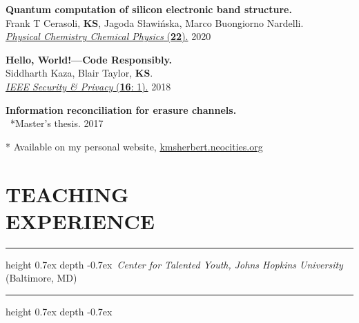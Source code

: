 \documentclass[marginmode, 10pt]{res} %
\newcommand{\me}{\textbf{KS}}       %
\def\Vhrulefill{\leavevmode\leaders\hrule height 0.7ex depth \dimexpr0.4pt-0.7ex\hfill\kern0pt}         %
\begin{document}
\begin{resume}
\textbf{Quantum computation of silicon electronic band structure.} \\
    Frank T Cerasoli, \me, Jagoda S\l{}awi\'nska, Marco Buongiorno Nardelli. \\
    \href{https://arxiv.org/abs/2006.03807}{\textit{Physical Chemistry Chemical Physics} (\textbf{22}).} \hfill 2020

\textbf{Hello, World!—Code Responsibly.} \\
    Siddharth Kaza, Blair Taylor, \me. \\
    \href{https://ieeexplore.ieee.org/document/8283486}{\textit{IEEE Security \& Privacy} (\textbf{16}: 1).} \hfill 2018

\textbf{Information reconciliation for erasure channels.} \\
    ~*Master's thesis. \hfill 2017

* Available on my personal website, \href{kmsherbert.neocities.org}{kmsherbert.neocities.org}


\pagebreak

\section{\small{TEACHING\\EXPERIENCE}}

\Vhrulefill ~\textit{Center for Talented Youth, Johns Hopkins University} (Baltimore, MD)~ \Vhrulefill


\end{resume}
\end{document}
